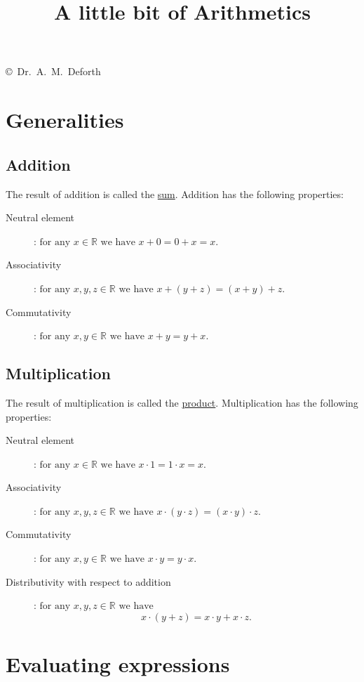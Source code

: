 \documentclass[12pt]{article}
\begin{document}
\title{A little bit of Arithmetics}
\maketitle
\begin{center}
\copyright\ Dr.~A.~M.~Deforth
\end{center}
\section{Generalities}
\subsection{Addition}
The result of addition is called the \underline{sum}. Addition has the following properties:
\begin{description}
\item[Neutral element]: $\text{for any } x\in \mathbb{R} \text{ we have } x+0=0+x=x$.
\item[Associativity]: $\text{for any } x,y,z\in \mathbb{R} \text{ we have } x+(y+z)=(x+y)+z$.
\item[Commutativity]: $\text{for any } x,y\in \mathbb{R} \text{ we have } x+y=y+x$.
\end{description}


\subsection{Multiplication}
The result of multiplication is called the \underline{product}. Multiplication has the following properties:
\begin{description}
\item[Neutral element]: $\text{for any } x\in \mathbb{R} \text{ we have } x\cdot 1=1\cdot x=x$.
\item[Associativity]: $\text{for any } x,y,z\in \mathbb{R} \text{ we have } x\cdot (y\cdot z)=(x\cdot y) \cdot z$.
\item[Commutativity]: $\text{for any } x,y\in \mathbb{R} \text{ we have } x\cdot y=y\cdot x$.
\item[Distributivity with respect to addition]: $\text{for any } x,y,z\in \mathbb{R} \text{ we have }$ $$x\cdot (y+z)=x\cdot y+x\cdot z.$$
\end{description}

\section{Evaluating expressions}
\end{document}

